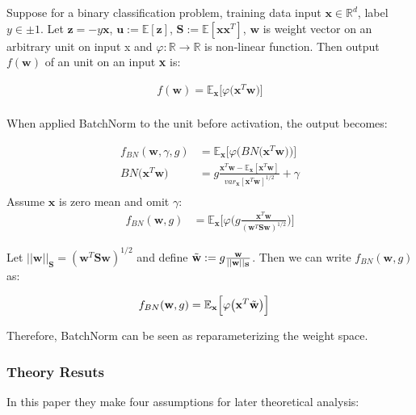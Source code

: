 \documentclass{article}
\begin{document}
Suppose for a binary classification problem, training data input $\textbf{x}\in\mathbb{R}^d$, label $y\in{\pm1}$. Let $\textbf{z}=-y\textbf{x}$, $\textbf{u}:=\mathbb{E}[\textbf{z}]$, $\textbf{S}:=\mathbb{E}[\textbf{xx}^T]$, $\textbf{w}$ is weight vector on an arbitrary unit on input x and $\varphi: \mathbb{R}\xrightarrow{}\mathbb{R}$ is non-linear function. Then output $f(\textbf{w})$ of an unit on an input \textbf{x} is:

\begin{align*}
	f(\textbf{w})=\mathbb{E}_{\textbf{x}}\big[\varphi\big(\textbf{x}^T\textbf{w}\big)\big]\\
\end{align*}

When applied BatchNorm to the unit before activation, the output becomes:

\begin{align*}
	f_{BN}(\textbf{w},\gamma,g)&=\mathbb{E}_{\textbf{x}}\big[\varphi\big(BN\big(\textbf{x}^T\textbf{w}\big)\big)\big]\\
	BN\big(\textbf{x}^T\textbf{w}\big)&=g\frac{\textbf{x}^T\textbf{w}-\mathbb{E}_{\textbf{x}}[\textbf{x}^T\textbf{w}]}{var_\textbf{x}[\textbf{x}^T\textbf{w}]^{1/2}}+\gamma\\
\end{align*}
Assume $\textbf{x}$ is zero mean and omit $\gamma$:
\begin{align*}
	f_{BN}(\textbf{w},g)&=\mathbb{E}_{\textbf{x}}\Big[\varphi\Big(g\frac{\textbf{x}^T\textbf{w}}{(\textbf{w}^T\textbf{Sw})^{1/2}}\Big)\Big]
\end{align*}

Let $||\textbf{w}||_{\textbf{S}}=(\textbf{w}^T\textbf{Sw})^{1/2}$ and define $\Tilde{\textbf{w}}:=g\frac{\textbf{w}}{||\textbf{w}||_{\textbf{S}}}$. Then we can write  $f_{BN}(\textbf{w},g)$ as:

\begin{align*}
    f_{BN}(\textbf{w},g)&=\mathbb{E}_{\textbf{x}}\Big[\varphi\big(\textbf{x}^T\Tilde{\textbf{w}}\big)\Big]
\end{align*}

Therefore, BatchNorm can be seen as reparameterizing the weight space.

\subsubsection{Theory Resuts}

In this paper they make four assumptions for later theoretical analysis:
\end{document}
